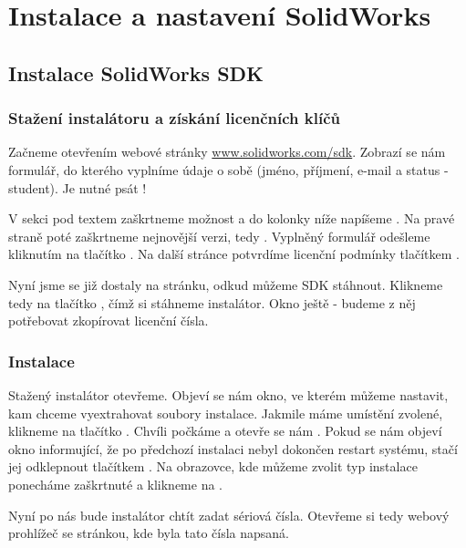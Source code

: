 \chapter{Instalace a nastavení SolidWorks}
\section{Instalace SolidWorks SDK}

\subsection*{Stažení instalátoru a získání licenčních klíčů}
Začneme otevřením webové stránky \href{http://www.solidworks.com/sdk}{www.solidworks.com/sdk}.
Zobrazí se nám formulář, do kterého vyplníme údaje o sobě (jméno, příjmení, e-mail a status - student).
Je nutné psát !

\fxnote[author=PŠ]{\textcolor{mygreen}{Sem přijde screenshot formuláře}}

V sekci  pod textem  zaškrtneme možnost  a do kolonky níže napíšeme .
Na pravé straně poté zaškrtneme nejnovější verzi, tedy .
Vyplněný formulář odešleme kliknutím na tlačítko .
Na další stránce potvrdíme licenční podmínky tlačítkem .

Nyní jsme se již dostaly na stránku, odkud můžeme SDK stáhnout.
Klikneme tedy na tlačítko , čímž si stáhneme instalátor.
Okno ještě  - budeme z něj potřebovat zkopírovat licenční čísla. 

\subsection*{Instalace}
Stažený instalátor otevřeme. 
Objeví se nám okno, ve kterém můžeme nastavit, kam chceme vyextrahovat soubory instalace.
Jakmile máme umístění zvolené, klikneme na tlačítko .
Chvíli počkáme a otevře se nám .
Pokud se nám objeví okno informující, že po předchozí instalaci nebyl dokončen restart systému, stačí jej odklepnout tlačítkem .
Na obrazovce, kde můžeme zvolit typ instalace ponecháme zaškrtnuté  a klikneme na .

Nyní po nás bude instalátor chtít zadat sériová čísla. 
Otevřeme si tedy webový prohlížeč se stránkou, kde byla tato čísla napsaná.


